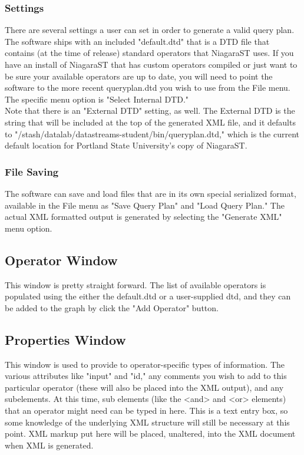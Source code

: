 \documentclass{article}
\begin{document}
\subsubsection {Settings}  There are several settings a user can set in order to generate a valid query plan.  The software ships with an included "default.dtd" that is a DTD file that contains (at the time of release) standard operators that NiagaraST uses.  If you have an install of NiagaraST that has custom operators compiled or just want to be sure your available operators are up to date, you will need to point the software to the more recent queryplan.dtd you wish to use from the File menu.  The specific menu option is "Select Internal DTD."\\
Note that there is an "External DTD" setting, as well.  The External DTD is the string that will be included at the top of the generated XML file, and it defaults to "/stash/datalab/datastreams-student/bin/queryplan.dtd," which is the current default location for Portland State University's copy of NiagaraST.
\subsubsection{File Saving}The software can save and load files that are in its own special serialized format, available in the File menu as "Save Query Plan" and "Load Query Plan."  The actual XML formatted output is generated by selecting the "Generate XML" menu option.
\subsection{Operator Window}  This window is pretty straight forward.  The list of available operators is populated using the either the default.dtd or a user-supplied dtd, and they can be added to the graph by click the "Add Operator" button.
\subsection{Properties Window} This window is used to provide to operator-specific types of information.  The various attributes like "input" and "id," any comments you wish to add to this particular operator (these will also be placed into the XML output), and any subelements.  At this time, sub elements (like the <and> and <or> elements) that an operator might need can be typed in here.  This is a text entry box, so some knowledge of the underlying XML structure will still be necessary at this point.  XML markup put here will be placed, unaltered, into the XML document when XML is generated.
\end{document}
